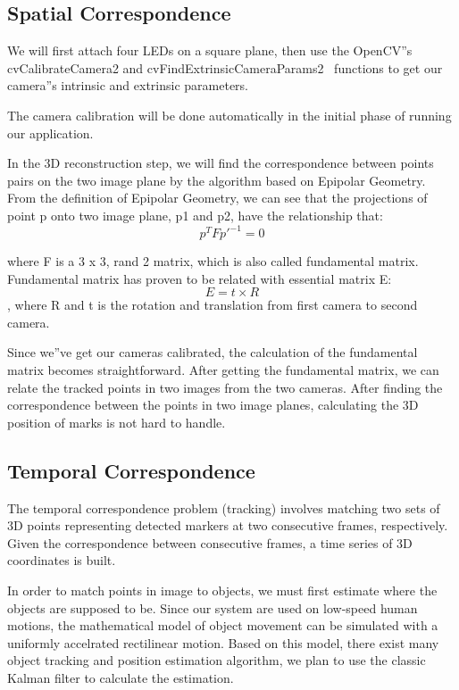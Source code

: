 \documentclass[10pt,twocolumn,letterpaper]{article}
\begin{document}
\subsection{Spatial Correspondence}
We will first attach four LEDs on a square plane, 
then use the OpenCV''s cvCalibrateCamera2 and 
cvFindExtrinsicCameraParams2~\cite{Zhang00} 
functions to get our camera''s intrinsic and extrinsic parameters.

The camera calibration will be done automatically 
in the initial phase of running our application.

In the 3D reconstruction step, we will find the 
correspondence between points pairs on the two image 
plane by the algorithm based on Epipolar Geometry. 
From the definition of Epipolar Geometry, 
we can see that the projections of point p onto 
two image plane, p1 and p2, have the relationship 
that:$$p^{T}Fp'^{-1} = 0$$\cite{Faugeras92}

where F is a 3 x 3, rand 2 matrix, which is also 
called fundamental matrix. Fundamental matrix has 
proven to be related with essential matrix E:$$E = t\times R$$, 
where R and t is the rotation and translation from first camera to second camera.

Since we''ve get our cameras calibrated, the calculation of 
the fundamental matrix becomes straightforward. After 
getting the fundamental matrix, we can relate the 
tracked points in two images from the two cameras. 
After finding the correspondence between the points 
in two image planes, calculating the 3D position of marks is not hard to handle. 

\subsection{Temporal Correspondence}
The temporal correspondence problem (tracking) involves matching 
two sets of 3D points representing detected markers at two consecutive
 frames, respectively. Given the correspondence between consecutive
 frames, a time series of 3D coordinates is built.

In order to match points in image to objects, we must first estimate 
where the objects are supposed to be. Since our system are used on low-speed
human motions, the mathematical model of object movement can be simulated with a 
uniformly accelrated rectilinear motion. Based on this model, there exist 
many object tracking and position estimation algorithm, we plan to use the
classic Kalman filter to calculate the estimation.
\end{document}
